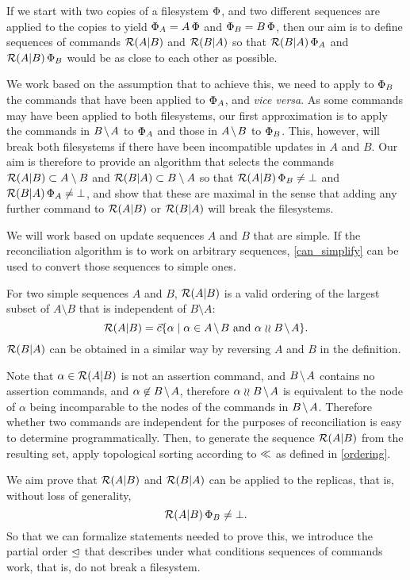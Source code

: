 
If we start with two copies of a filesystem $\Phi$,
and two different sequences are applied to the copies to yield $\Phi_A=A\,\Phi$
and $\Phi_B=B\,\Phi$, then our aim is to define sequences of commands $\mathcal{R}({A}|{B})$ and $\mathcal{R}({B}|{A})$
so that $\mathcal{R}({B}|{A})\,\Phi_A$ and $\mathcal{R}({A}|{B})\,\Phi_B$ would be as close to each other as possible.

We work based on the assumption that to achieve this, we need
to apply to $\Phi_B$ the commands that have been applied to $\Phi_A$, and \emph{vice versa}.
As some commands may have been applied to both filesystems, our first approximation
is to apply the commands in $\bmanp$ to $\Phi_A$ and those in $\ambnp$ to $\Phi_B$.
This, however, will break both filesystems if there have been incompatible updates
in $A$ and $B$. 
Our aim is therefore to provide an algorithm that selects the commands 
$\mathcal{R}({A}|{B}) \subset A\setminus B$
and $\mathcal{R}({B}|{A}) \subset B\setminus A$ 
so that $\mathcal{R}({A}|{B})\,\Phi_B\neq\bot$ and $\mathcal{R}({B}|{A})\,\Phi_A\neq\bot$,
and show that these are maximal in the sense that
adding any further command to $\mathcal{R}({A}|{B})$ or $\mathcal{R}({B}|{A})$ will break the filesystems.

We will work based on update sequences $A$ and $B$ that are simple.
If the reconciliation algorithm is to work on arbitrary sequences,
\cref{can_simplify} can be used to convert those sequences to simple ones.

\begin{mydef}[Reconciliation]
For two simple sequences $A$ and $B$,
$\mathcal{R}({A}|{B})$ is a valid ordering of
the largest subset of $A\setminus B$
that is independent of $B\setminus A$:
\[ \reca = \ords{\alpha \whr \alpha\in \ambnp  \mbox{~and~}  \alpha\indep \bmanp }. \]
$\mathcal{R}({B}|{A})$ can be obtained in a similar way by reversing $A$ and $B$
in the definition.
\end{mydef}

Note that $\alpha\in\mathcal{R}({A}|{B})$ is not an assertion command, and $\bmanp$ contains no assertion commands,
and $\alpha\not\in\bmanp$, therefore $\alpha\indep\bmanp$ is equivalent to
the node of $\alpha$ being incomparable to the nodes of the commands in $\bmanp$.
Therefore whether two commands are independent 
for the purposes of reconciliation
is easy to determine programmatically.
Then, to generate the sequence $\mathcal{R}({A}|{B})$ from the resulting set, 
apply topological sorting according to $\ll$ as defined in \cref{ordering}.


\myskip
We aim prove that $\mathcal{R}({A}|{B})$ and $\mathcal{R}({B}|{A})$ can be applied to the replicas,
that is, without loss of generality,
\[ \mathcal{R}({A}|{B})\,\Phi_B\neq\bot. \]
So that we can formalize statements needed to prove this,
we introduce the partial order $\trianglelefteq$ that describes under what conditions
sequences of commands work, that is, do not break a filesystem.
